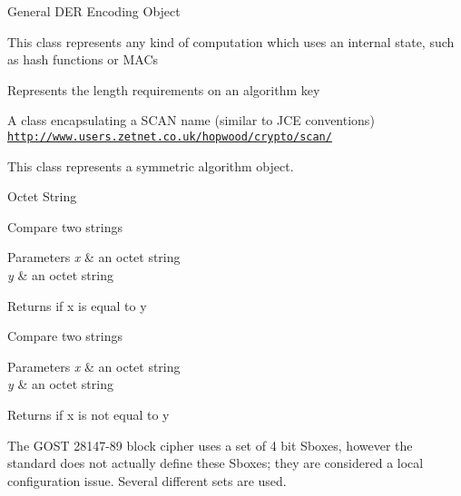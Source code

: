 General D\+ER Encoding Object

This class represents any kind of computation which uses an internal state, such as hash functions or M\+A\+Cs

Represents the length requirements on an algorithm key

A class encapsulating a S\+C\+AN name (similar to J\+CE conventions) \href{http://www.users.zetnet.co.uk/hopwood/crypto/scan/}{\tt http\+://www.\+users.\+zetnet.\+co.\+uk/hopwood/crypto/scan/}

This class represents a symmetric algorithm object.

Octet String

Compare two strings 
\begin{DoxyParams}{Parameters}
{\em x} & an octet string \\
\hline
{\em y} & an octet string \\
\hline
\end{DoxyParams}
\begin{DoxyReturn}{Returns}
if x is equal to y
\end{DoxyReturn}
Compare two strings 
\begin{DoxyParams}{Parameters}
{\em x} & an octet string \\
\hline
{\em y} & an octet string \\
\hline
\end{DoxyParams}
\begin{DoxyReturn}{Returns}
if x is not equal to y
\end{DoxyReturn}
The G\+O\+ST 28147-\/89 block cipher uses a set of 4 bit Sboxes, however the standard does not actually define these Sboxes; they are considered a local configuration issue. Several different sets are used.

